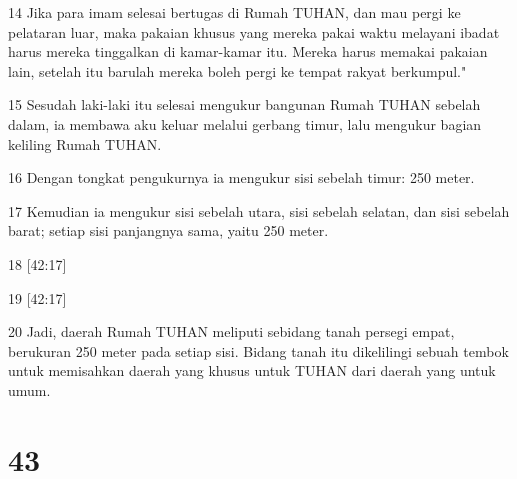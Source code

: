 \par 14 Jika para imam selesai bertugas di Rumah TUHAN, dan mau pergi ke pelataran luar, maka pakaian khusus yang mereka pakai waktu melayani ibadat harus mereka tinggalkan di kamar-kamar itu. Mereka harus memakai pakaian lain, setelah itu barulah mereka boleh pergi ke tempat rakyat berkumpul."
\par 15 Sesudah laki-laki itu selesai mengukur bangunan Rumah TUHAN sebelah dalam, ia membawa aku keluar melalui gerbang timur, lalu mengukur bagian keliling Rumah TUHAN.
\par 16 Dengan tongkat pengukurnya ia mengukur sisi sebelah timur: 250 meter.
\par 17 Kemudian ia mengukur sisi sebelah utara, sisi sebelah selatan, dan sisi sebelah barat; setiap sisi panjangnya sama, yaitu 250 meter.
\par 18 [42:17]
\par 19 [42:17]
\par 20 Jadi, daerah Rumah TUHAN meliputi sebidang tanah persegi empat, berukuran 250 meter pada setiap sisi. Bidang tanah itu dikelilingi sebuah tembok untuk memisahkan daerah yang khusus untuk TUHAN dari daerah yang untuk umum.

\chapter{43}

